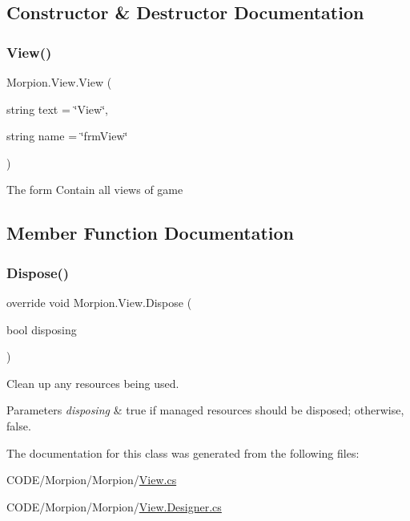 \subsection{Constructor \& Destructor Documentation}
\mbox{\label{class_morpion_1_1_view_ab8a0a6c6141f31f7e175ba5ad49140c3}} 
\subsubsection{\texorpdfstring{View()}{View()}}
{\footnotesize\ttfamily Morpion.\+View.\+View (\begin{DoxyParamCaption}\item[{string}]{text = {\ttfamily \char`\"{}View\char`\"{}},  }\item[{string}]{name = {\ttfamily \char`\"{}frmView\char`\"{}} }\end{DoxyParamCaption})}



The form Contain all views of game 



\subsection{Member Function Documentation}
\mbox{\label{class_morpion_1_1_view_a3c537c54a79236b4cfd9e78415dd48f5}} 
\subsubsection{\texorpdfstring{Dispose()}{Dispose()}}
{\footnotesize\ttfamily override void Morpion.\+View.\+Dispose (\begin{DoxyParamCaption}\item[{bool}]{disposing }\end{DoxyParamCaption})\hspace{0.3cm}{\ttfamily [protected]}}



Clean up any resources being used. 


\begin{DoxyParams}{Parameters}
{\em disposing} & true if managed resources should be disposed; otherwise, false.\\
\hline
\end{DoxyParams}


The documentation for this class was generated from the following files\+:\begin{DoxyCompactItemize}
\item 
C\+O\+D\+E/\+Morpion/\+Morpion/\hyperlink{_view_8cs}{View.\+cs}\item 
C\+O\+D\+E/\+Morpion/\+Morpion/\hyperlink{_view_8_designer_8cs}{View.\+Designer.\+cs}\end{DoxyCompactItemize}
